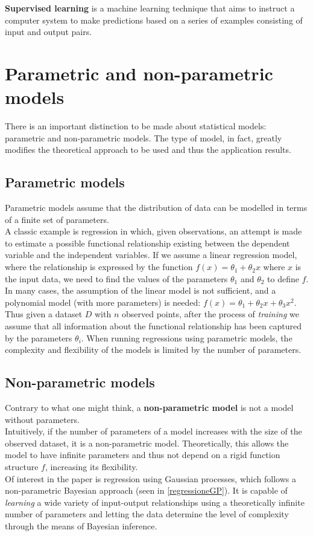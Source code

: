 \begin{defi}
    \textbf{Supervised learning} is a machine learning technique that aims to instruct a computer system to make predictions based on a series of examples consisting of input and output pairs.
\end{defi}



\newpage
\section{Parametric and non-parametric models}
There is an important distinction to be made about statistical models: parametric and non-parametric models. The type of model, in fact, greatly modifies the theoretical approach to be used and thus the application results. 


\subsection{Parametric models}
Parametric models assume that the distribution of data can be modelled in terms of a finite set of parameters.\\
A classic example is regression in which, given observations, an attempt is made to estimate a possible functional relationship existing between the dependent variable and the independent variables. If we assume a linear regression model, where the relationship is expressed by the function $f(x) = \theta_1 + \theta_2x$ where $x$ is the input data, we need to find the values of the parameters $\theta_1$ and $\theta_2$ to define $f$. In many cases, the assumption of the linear model is not sufficient, and a polynomial model (with more parameters) is needed: $f(x) = \theta_1+\theta_2x+\theta_3x^2$.\\
Thus given a dataset $D$ with $n$ observed points, after the process of \textit{training} we assume that all information about the functional relationship has been captured by the parameters $\theta_i$.  When running regressions using parametric models, the complexity and flexibility of the models is limited by the number of parameters. 

\subsection{Non-parametric models}
Contrary to what one might think, a \textbf{non-parametric model} is not a model without parameters. \\
Intuitively, if the number of parameters of a model increases with the size of the observed dataset, it is a non-parametric model. Theoretically, this allows the model to have infinite parameters and thus not depend on a rigid function structure $f$, increasing its flexibility.\\
Of interest in the paper is regression using Gaussian processes, which follows a non-parametric Bayesian approach (seen in \ref{regressioneGP}). It is capable of \textit{learning} a wide variety of input-output relationships using a theoretically infinite number of parameters and letting the data determine the level of complexity through the means of Bayesian inference.

